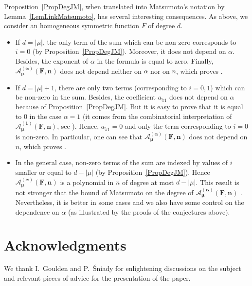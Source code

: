 \documentclass[11pt]{amsart}
\theoremstyle{plain}
\theoremstyle{remark}
\begin{document}
Proposition~\ref{PropDegJM}, when translated into Matsumoto's notation by
Lemma~\ref{LemLinkMatsumoto}, has several interesting consequences.
As above, we consider an homogeneous symmetric function $F$ of degree $d$.
\begin{itemize}
    \item If $d=|\mu|$, the only term of the sum which can be non-zero
        corresponds to $i=0$ (by Proposition~\ref{PropDegJM}).
        Moreover, it does not depend on $\alpha$.
        Besides, the exponent of $\alpha$ in the formula is equal to zero.
        Finally, $\bm{\mathcal{A}_\mu^{(\alpha)}(F,n)}$ does not depend
        neither on $\alpha$ nor on $n$, which proves \cite[Conjecture 9.2]{MatsumotoOddJM}.
    \item If $d=|\mu|+1$, there are only two terms
        (corresponding to $i=0,1$) which can be
        non-zero in the sum.
        Besides, the coefficient $a_{\tilde{\pi} 1}$ does not depend on $\alpha$
        because of Proposition~\ref{PropDegJM}.
        But it is easy to prove that it is equal to $0$ in the case $\alpha=1$
        (it comes from the combinatorial interpretation of $\bm{\mathcal{A}_\mu^{(1)}(F,n)}$,
        see \cite[Example 9.2]{MatsumotoOddJM}).
        Hence, $a_{\tilde{\pi} 1}=0$ and only the term corresponding to $i=0$
        is non-zero.
        In particular, one can see that $\bm{\mathcal{A}_\mu^{(\alpha)}(F,n)}$
        does not depend on $n$, which proves \cite[Conjecture 9.3]{MatsumotoOddJM}.
    \item In the general case, non-zero terms of the sum are indexed by 
        values of $i$ smaller or equal to $d - |\mu|$ (by Proposition~\ref{PropDegJM}).
        Hence $\bm{\mathcal{A}_\mu^{(\alpha)}(F,n)}$ is a polynomial in $n$ of degree
        at most $d - |\mu|$.
        This result is not stronger that the bound of Matsumoto on the
        degree of $\bm{\mathcal{A}_\mu^{(\alpha)}(F,n)}$ \cite[Theorem 8.8]{MatsumotoOddJM}.
        Nevertheless, it is better in some cases 
        and we also have some control on the dependence on $\alpha$
        (as illustrated by the proofs of the
        conjectures above).
\end{itemize}
\section*{Acknowledgments}

We thank I.~Goulden and P.~\'Sniady for enlightening discussions on the subject
and relevant pieces of advice for the presentation of the paper.




\end{document}

